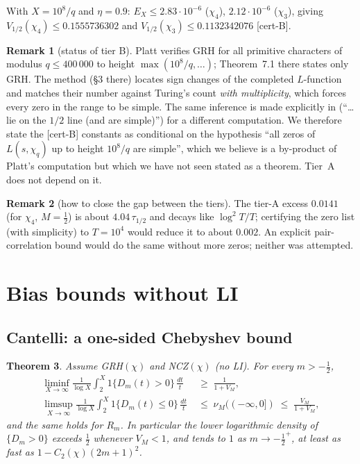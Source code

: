 \documentclass[11pt]{amsart}
\newtheorem{theorem}{Theorem}[section]
\theoremstyle{definition}
\newtheorem{remark}[theorem]{Remark}
\numberwithin{equation}{section}
\newcommand{\certB}{\textsf{[cert-B]}}
\begin{document}
With $X=10^8/q$ and $\eta=0.9$: $E_X\le2.83\cdot10^{-6}$ ($\chi_4$),
$2.12\cdot10^{-6}$ ($\chi_3$), giving
$V_{1/2}(\chi_4)\le0.1555736302$ and
$V_{1/2}(\chi_3)\le0.1132342076$ \certB.

\begin{remark}[status of tier B]\label{rem:tierB}
Platt \cite{Pla16} verifies GRH for all primitive characters of
modulus $q\le400\,000$ to height $\max(10^8/q,\dots)$; Theorem~7.1
there states only GRH. The method (\S3 there) locates sign changes of
the completed $L$-function and matches their number against Turing's
count \emph{with multiplicity}, which forces every zero in the range
to be simple. The same inference is made explicitly in
\cite[\S2.1]{PT26} (``\dots lie on the $1/2$ line (and are simple)'')
for a different computation. We therefore state the \certB{}
constants as conditional on the hypothesis ``all zeros of
$L(s,\chi_q)$ up to height $10^8/q$ are simple'', which we believe is
a by-product of Platt's computation but which we have not seen stated
as a theorem. Tier~A does not depend on it.
\end{remark}

\begin{remark}[how to close the gap between the tiers]
\label{rem:closegap}
The tier-A excess $0.0141$ (for $\chi_4$, $M=\tfrac12$) is about
$4.04\,\tau_{1/2}$ and decays like $\log^2T/T$; certifying the zero
list (with simplicity) to $T=10^4$ would reduce it to about $0.002$.
An explicit pair-correlation bound would do the same without more
zeros; neither was attempted.
\end{remark}

\section{Bias bounds without LI}\label{sec:biasbounds}

\subsection{Cantelli: a one-sided Chebyshev bound}

\begin{theorem}\label{thm:cantelli}
Assume GRH$(\chi)$ and NCZ$(\chi)$ (no LI). For every $m>-\tfrac12$,
\begin{align*}
\liminf_{X\to\infty}\frac1{\log X}\int_2^X1\{D_m(t)>0\}\,\frac{dt}t
&\;\ge\;\frac1{1+V_M},\\
\limsup_{X\to\infty}\frac1{\log X}\int_2^X1\{D_m(t)\le0\}\,\frac{dt}t
&\;\le\;\nu_M((-\infty,0])\;\le\;\frac{V_M}{1+V_M},
\end{align*}
and the same holds for $R_m$. In particular the lower logarithmic
density of $\{D_m>0\}$ exceeds $\tfrac12$ whenever $V_M<1$, and
tends to $1$ as $m\to-\tfrac12^+$, at least as fast as
$1-C_2(\chi)(2m+1)^2$.
\end{theorem}
\end{document}
